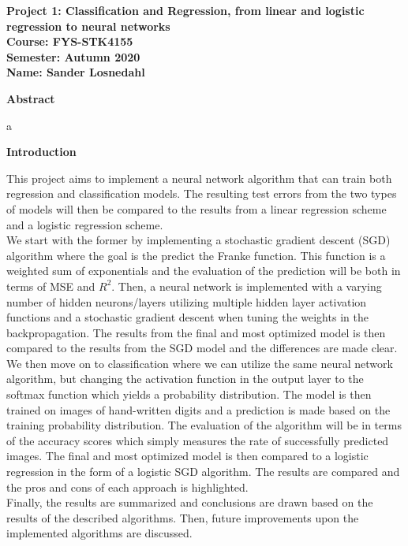 \documentclass[12pt,a4paper]{article}
\begin{document}
\begin{center}
\LARGE{\textbf{Project 1: Classification and Regression, from linear and logistic regression to neural networks}}
\\
\large{\textbf{Course: FYS-STK4155}}
\\
\large{\textbf{Semester: Autumn 2020}}
\\
\large{\textbf{Name: Sander Losnedahl}}
\end{center}

\begin{center}
\Large{\textbf{Abstract}}
\end{center}

\noindent a

\newpage

\begin{center}
\Large{\textbf{Introduction}}
\end{center}

\noindent This project aims to implement a neural network algorithm that can train both regression and classification models. The resulting test errors from the two types of models will then be compared to the results from a linear regression scheme and a logistic regression scheme. 
\\
We start with the former by implementing a stochastic gradient descent (SGD) algorithm where the goal is the predict the Franke function. This function is a weighted sum of exponentials and the evaluation of the prediction will be both in terms of MSE and $R^2$. Then, a neural network is implemented with a varying number of hidden neurons/layers utilizing multiple hidden layer activation functions and a stochastic gradient descent when tuning the weights in the backpropagation. The results from the final and most optimized model is then compared to the results from the SGD model and the differences are made clear.
\\
We then move on to classification where we can utilize the same neural network algorithm, but changing the activation function in the output layer to the softmax function which yields a probability distribution. The model is then trained on images of hand-written digits and a prediction is made based on the training probability distribution. The evaluation of the algorithm will be in terms of the accuracy scores which simply measures the rate of successfully predicted images. The final and most optimized model is then compared to a logistic regression in the form of a logistic SGD algorithm. The results are compared and the pros and cons of each approach is highlighted.
\\
Finally, the results are summarized and conclusions are drawn based on the results of the described algorithms. Then, future improvements upon the implemented algorithms are discussed.
\end{document}
